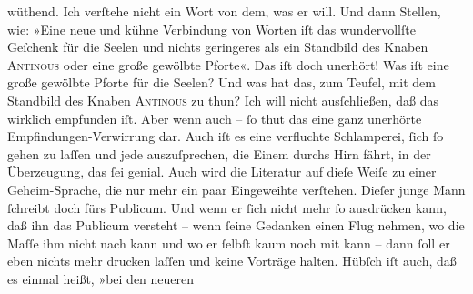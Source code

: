 \begin{ledgroupsized}[t]{13cm}
               wüthend. Ich verſtehe nicht ein Wort von dem, was er will. Und dann Stellen, wie:
                  »Eine neue und kühne Verbindung
                  von Worten iſt das wundervollſte Geſchenk für die Seelen und nichts geringeres als
                  ein Standbild des Knaben \textsc{Antinous} oder eine große gewölbte Pforte«. Das iſt doch unerhört! Was iſt eine
               große gewölbte {\pb}Pforte für die Seelen? Und was hat
               das, zum Teufel, mit dem Standbild des Knaben \textsc{Antinous} zu thun? Ich will nicht ausſchließen, daß das wirklich empfunden iſt. Aber wenn
               auch – ſo thut das eine ganz unerhörte Empfindungen-Verwirrung dar. Auch iſt es eine
               verfluchte Schlamperei, ſich ſo gehen zu laſſen und jede \label{K_L02775-4v}\label{K_L02775-4h} auszuſprechen, die Einem durchs Hirn fährt,  in der Überzeugung, das {\pb}ſei genial. Auch
               wird die Literatur auf dieſe Weiſe zu einer Geheim-Sprache, die nur mehr ein paar
               Eingeweihte verſtehen. Dieſer junge Mann ſchreibt doch fürs Publicum. Und wenn er ſich nicht mehr
               ſo ausdrücken kann, daß ihn das Publicum versteht – wenn ſeine Gedanken einen Flug
               nehmen, {\pb}wo die Maſſe ihm nicht nach kann und wo er
               ſelbſt kaum noch mit kann – dann ſoll er eben  nichts mehr drucken laſſen und keine Vorträge halten. Hübſch iſt auch, daß es
               einmal heißt, »bei den neueren

\end{ledgroupsized}
